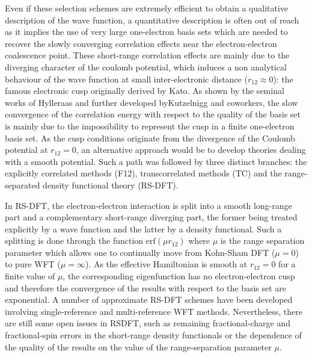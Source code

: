 \documentclass[aip,jcp,reprint,noshowkeys,superscriptaddress]{revtex4-1}
\begin{document}
Even if these selection schemes are extremely efficient to obtain a qualitative description of the wave function, a quantitative description is often out of reach as it implies the use of very large one-electron basis sets which are needed to recover the slowly converging correlation effects near the electron-electron coalescence point. 
These short-range correlation effects are mainly due to the diverging character of the coulomb potential, which induces a non analytical behaviour of the wave function at small inter-electronic distance ($r_{12}\approx 0$): the famous electronic cusp originally derived by Kato\cite{Kat-CPAM-57}. As shown by the seminal works of Hylleraas \cite{Hyl-ZP-29} and further developed byKutzelnigg and coworkers, \cite{Kut-TCA-85,KutKlo-JCP-91, NogKut-JCP-94} the slow convergence of the correlation energy with respect to the quality of the basis set is mainly due to the impossibility to represent the cusp in a finite one-electron basis set. 
As the cusp conditions originate from the divergence of the Coulomb potential at $r_{12}=0$, an alternative approach would be to develop theories dealing with a smooth potential. Such a path was followed by three distinct branches: 
the explicitly correlated methods (F12), transcorrelated methods (TC) and the range-separated density functional theory (RS-DFT). 

In RS-DFT\cite{Sav-INC-96a,TouColSav-PRA-04}, the electron-electron interaction is split into a smooth long-range part and a complementary short-range diverging part, the former being treated explicitly by a wave function and the latter by a density functional. 
Such a splitting is done through the function $\text{erf}(\mu r_{12})$ where $\mu$ is the range separation parameter which allows one to continually move from Kohn-Sham DFT ($\mu=0$) to pure WFT ($\mu=\infty$). 
As the effective Hamiltonian is smooth at $r_{12}=0$ for a finite value of $\mu$, the corresponding eigenfunction has no electron-electron cusp\cite{GorSav-PRA-06} and therefore the convergence of the results with respect to the basis set are exponential\cite{FraMusLupTou-JCP-15}. 
A number of approximate RS-DFT schemes have been developed involving single-reference\cite{AngGerSavTou-PRA-05, GolWerSto-PCCP-05, TouGerJanSavAng-PRL-09,JanHenScu-JCP-09,TouZhuSavJanAng-JCP-11, MusReiAngTou-JCP-15,KalTou-JCP-18,KalMusTou-JCP-19} and multi-reference\cite{LeiStoWerSav-CPL-97, FroTouJen-JCP-07, FroCimJen-PRA-10, HedKneKieJenRei-JCP-15, HedTouJen-JCP-18, FerGinTou-JCP-18} WFT methods. 
Nevertheless, there are still some open issues in RSDFT, such as remaining fractional-charge and fractional-spin errors in the short-range density functionals \cite{MusTou-MP-17} or the dependence of the quality of the results on the value of the range-separation parameter $\mu$. 
\end{document}
